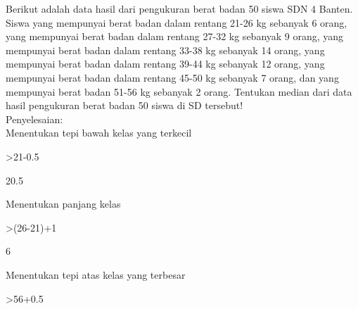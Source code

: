 \documentclass[12pt,arial,letterpaper]{book}
\begin{document}
\begin{eulercomment}
\begin{eulercomment}
\begin{eulercomment}
\begin{eulercomment}
\begin{eulercomment}
\begin{eulercomment}
\begin{eulercomment}
\begin{eulercomment}
\begin{eulercomment}
\begin{eulercomment}
\begin{eulercomment}
\begin{eulercomment}
\begin{eulercomment}
\begin{eulercomment}
\begin{eulercomment}
\begin{eulercomment}
\begin{eulercomment}
\begin{eulercomment}
\begin{eulercomment}
\begin{eulercomment}
\begin{eulercomment}
\begin{eulercomment}
\begin{eulercomment}
\begin{eulercomment}
\begin{eulercomment}
\begin{eulercomment}
\begin{eulercomment}
\begin{eulercomment}
\begin{eulercomment}
\begin{eulercomment}
\begin{eulercomment}
\begin{eulercomment}
\begin{eulercomment}
\begin{eulercomment}
\begin{eulercomment}
\begin{eulercomment}
\begin{eulercomment}
\begin{eulercomment}
\begin{eulercomment}
\end{eulercomment}
\begin{eulercomment}
Berikut adalah data hasil dari pengukuran berat badan 50 siswa SDN 4
Banten. Siswa yang mempunyai berat badan dalam rentang 21-26 kg
sebanyak 6 orang, yang mempunyai berat badan dalam rentang 27-32 kg
sebanyak 9 orang, yang mempunyai berat badan dalam rentang 33-38 kg
sebanyak 14 orang, yang mempunyai berat badan dalam rentang 39-44 kg
sebanyak 12 orang, yang mempunyai berat badan dalam rentang 45-50 kg
sebanyak 7 orang, dan yang mempunyai berat badan 51-56 kg sebanyak 2
orang. Tentukan median dari data hasil pengukuran berat badan 50 siswa
di SD tersebut!\\
Penyelesaian:\\
Menentukan tepi bawah kelas yang terkecil
\end{eulercomment}
\begin{eulerprompt}
>21-0.5
\end{eulerprompt}
\begin{euleroutput}
  20.5
\end{euleroutput}
\begin{eulercomment}
Menentukan panjang kelas
\end{eulercomment}
\begin{eulerprompt}
>(26-21)+1
\end{eulerprompt}
\begin{euleroutput}
  6
\end{euleroutput}
\begin{eulercomment}
Menentukan tepi atas kelas yang terbesar
\end{eulercomment}
\begin{eulerprompt}
>56+0.5
\end{eulerprompt}

\end{eulercomment}
\end{eulercomment}
\end{eulercomment}
\end{eulercomment}
\end{eulercomment}
\end{eulercomment}
\end{eulercomment}
\end{eulercomment}
\end{eulercomment}
\end{eulercomment}
\end{eulercomment}
\end{eulercomment}
\end{eulercomment}
\end{eulercomment}
\end{eulercomment}
\end{eulercomment}
\end{eulercomment}
\end{eulercomment}
\end{eulercomment}
\end{eulercomment}
\end{eulercomment}
\end{eulercomment}
\end{eulercomment}
\end{eulercomment}
\end{eulercomment}
\end{eulercomment}
\end{eulercomment}
\end{eulercomment}
\end{eulercomment}
\end{eulercomment}
\end{eulercomment}
\end{eulercomment}
\end{eulercomment}
\end{eulercomment}
\end{eulercomment}
\end{eulercomment}
\end{eulercomment}
\end{eulercomment}
\end{document}
